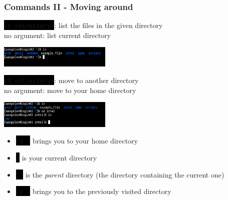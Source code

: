 \documentclass[unknownkeysallowed, 10pt, a4 paper, handout]{beamer}
\newcommand{\code}[1]{\colorbox{black}{\color{green}\texttt{#1}}}
\begin{document}
\begin{frame}[c]
  \begin{center}
    \frametitle{Commands II - Moving around}

    \code{ls <directory>}: list the files in the given directory\\
    no argument: list current directory
    \vspace{-2mm}

    \begin{center}
      \includegraphics[width=0.40\textwidth]{pics/ls.png}
    \end{center}

    \code{cd <directory>}: move to another directory\\
    no argument: move to your home directory
    \vspace{-2mm}

    \begin{center}
      \includegraphics[width=0.40\textwidth]{pics/cd.png}
    \end{center}

    \vspace{-4mm}

    \begin{itemize}
      \item \code{cd \~} brings you to your home directory
      \item \code{.} is your current directory
      \item \code{..} is the \textit{parent} directory (the directory containing the current one)
      \item \code{cd -} brings you to the previously visited directory
    \end{itemize}
  \end{center}
\end{frame}
\end{document}
